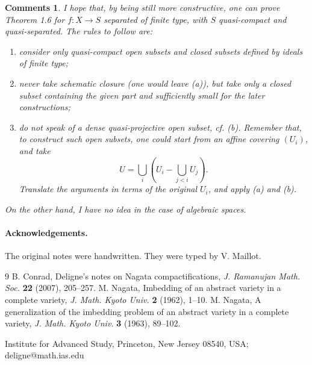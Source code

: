 \documentclass[11pt]{article}
\newtheorem*{comments}{Comments}
\begin{document}
\begin{comments}
I hope that, by being still more constructive, one can prove Theorem 1.6 for \(f:X\to S\) separated of finite type, with \(S\) quasi-compact and quasi-separated. The rules to follow are:
\begin{enumerate}[label=(\alph*)]
\item consider only quasi-compact open subsets and closed subsets defined by ideals of finite type;
\item never take schematic closure (one would leave (a)), but take only a closed subset containing the given part and sufficiently small for the later constructions;
\item do not speak of a dense quasi-projective open subset, cf. (b). Remember that, to construct such open subsets, one could start from an affine covering \((U_i)\), and take
\[
U=\bigcup_i\left(U_i-\bigcup_{j<i}U_j\right).
\]
Translate the arguments in terms of the original \(U_i\), and apply (a) and (b).
\end{enumerate}
On the other hand, I have no idea in the case of algebraic spaces.
\end{comments}

\paragraph{Acknowledgements.}
The original notes were handwritten. They were typed by V. Maillot.

\begin{thebibliography}{9}
 B. Conrad, Deligne's notes on Nagata compactifications, \emph{J. Ramanujan Math. Soc.} \textbf{22} (2007), 205--257.
 M. Nagata, Imbedding of an abstract variety in a complete variety, \emph{J. Math. Kyoto Univ.} \textbf{2} (1962), 1--10.
 M. Nagata, A generalization of the imbedding problem of an abstract variety in a complete variety, \emph{J. Math. Kyoto Univ.} \textbf{3} (1963), 89--102.
\end{thebibliography}

\begin{center}
Institute for Advanced Study, Princeton, New Jersey 08540, USA;\\
deligne@math.ias.edu
\end{center}
\end{document}
